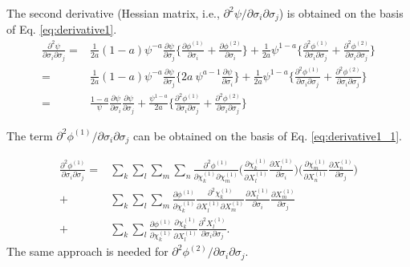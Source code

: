 \documentclass[12pt]{amsart}
\begin{document}
The second derivative (Hessian matrix, i.e., $\partial^2\psi/\partial\sigma_i\partial\sigma_j$) is obtained on the basis of Eq. \ref{eq:derivative1}.
\begin{equation}
  \label{eq:derivative2}
  \begin{split}
    \frac{\partial^2\psi}{\partial\sigma_i\partial\sigma_j}=&\frac{1}{2a} (1-a)\psi^{-a}\frac{\partial\psi}{\partial\sigma_j}  \bigg\{\frac{\partial\phi^{(1)}}{\partial\sigma_i}+\frac{\partial\phi^{(2)}}{\partial\sigma_i}\bigg\}+\frac{1}{2a}\psi^{1-a}   \bigg\{\frac{\partial^2\phi^{(1)}}{\partial\sigma_i\partial\sigma_j}+\frac{\partial^2\phi^{(2)}}{\partial\sigma_i\partial\sigma_j}\bigg\}\\
    =&\frac{1}{2a} (1-a)\psi^{-a}\frac{\partial\psi}{\partial\sigma_j}  \bigg\{2a\ \psi^{a-1} \frac{\partial\psi}{\partial\sigma_i} \bigg\}                +\frac{1}{2a}\psi^{1-a}   \bigg\{\frac{\partial^2\phi^{(1)}}{\partial\sigma_i\partial\sigma_j}+\frac{\partial^2\phi^{(2)}}{\partial\sigma_i\partial\sigma_j}\bigg\}\\
    =&\frac{1-a}{\psi}\frac{\partial\psi}{\partial\sigma_i}  \frac{\partial\psi}{\partial\sigma_j}   +\frac{\psi^{1-a}}{2a} \bigg\{\frac{\partial^2\phi^{(1)}}{\partial\sigma_i\partial\sigma_j}+\frac{\partial^2\phi^{(2)}}{\partial\sigma_i\partial\sigma_j}\bigg\}
  \end{split}
\end{equation}

The term $\partial^2\phi^{(1)}/\partial\sigma_i\partial\sigma_j$ can be obtained on the basis of Eq. \ref{eq:derivative1_1}.

\begin{equation}
  \label{eq:derivative_2_1}
  \begin{split}
    \frac{\partial^2\phi^{(1)}}{\partial\sigma_i\partial\sigma_j}=&\sum_k \sum_l \sum_m \sum_n \frac{\partial^2\phi^{(1)}}{\partial\chi^{(1)}_k\partial\chi^{(1)}_m} \bigg( \frac{\partial\chi^{(1)}_k}{\partial X^{(1)}_l}    \frac{\partial X^{(1)}_l}{\partial \sigma_i}\bigg)  \bigg( \frac{\partial\chi^{(1)}_m}{\partial X^{(1)}_n}    \frac{\partial X^{(1)}_n}{\partial \sigma_j}\bigg)\\
    +&\sum_k \sum_l \sum_m \frac{\partial\phi^{(1)} }{\partial\chi^{(1)}_k}     \frac{\partial^2\chi^{(1)}_k}{\partial X^{(1)}_l \partial  X^{(1)}_m}   \frac{\partial X^{(1)}_l}{\partial\sigma_i}    \frac{\partial X^{(1)}_m}{\partial\sigma_j}\\
    +&\sum_k \sum_l \frac{\partial\phi^{(1)} }{\partial\chi^{(1)}_k}   \frac{\partial\chi^{(1)}_k}{\partial X^{(1)}_l}  \frac{\partial^2 X^{(1)}_l}{\partial\sigma_i\partial\sigma_j}.
  \end{split}
\end{equation}
The same approach is needed for $\partial^2\phi^{(2)}/\partial\sigma_i\partial\sigma_j$.
\end{document}
